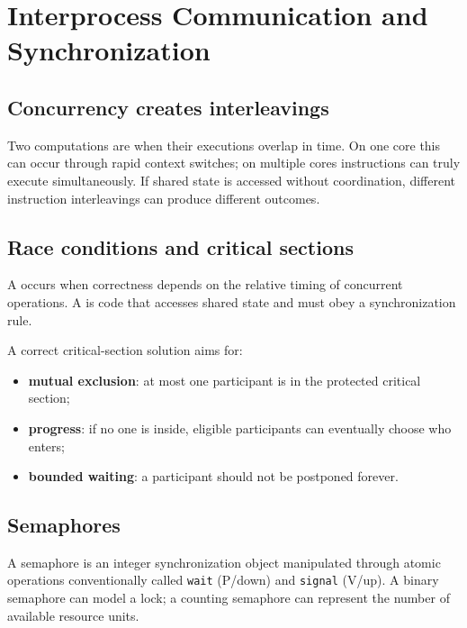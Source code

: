\chapter{Interprocess Communication and Synchronization}\label{ch:ipc}

\section{Concurrency creates interleavings}
Two computations are  when their executions overlap in time. On one core this can occur through rapid context switches; on multiple cores instructions can truly execute simultaneously. If shared state is accessed without coordination, different instruction interleavings can produce different outcomes.

\section{Race conditions and critical sections}
A  occurs when correctness depends on the relative timing of concurrent operations. A  is code that accesses shared state and must obey a synchronization rule.

A correct critical-section solution aims for:
\begin{itemize}
  \item \textbf{mutual exclusion}: at most one participant is in the protected critical section;
  \item \textbf{progress}: if no one is inside, eligible participants can eventually choose who enters;
  \item \textbf{bounded waiting}: a participant should not be postponed forever.
\end{itemize}

\section{Semaphores}
A semaphore is an integer synchronization object manipulated through atomic operations conventionally called \texttt{wait} (P/down) and \texttt{signal} (V/up). A binary semaphore can model a lock; a counting semaphore can represent the number of available resource units.


